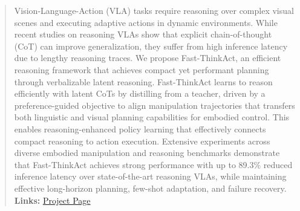 \begin{abstract}
Vision-Language-Action (VLA) tasks require reasoning over complex visual scenes and executing adaptive actions in dynamic environments. While recent studies on reasoning VLAs show that explicit chain-of-thought (CoT) can improve generalization, they suffer from high inference latency due to lengthy reasoning traces. We propose Fast-ThinkAct, an efficient reasoning framework that achieves compact yet performant planning through verbalizable latent reasoning. Fast-ThinkAct learns to reason efficiently with latent CoTs by distilling from a teacher, driven by a preference-guided objective to align manipulation trajectories that transfers both linguistic and visual planning capabilities for embodied control. This enables reasoning-enhanced policy learning that effectively connects compact reasoning to action execution. Extensive experiments across diverse embodied manipulation and reasoning benchmarks demonstrate that Fast-ThinkAct achieves strong performance with up to 89.3\% reduced inference latency over state-of-the-art reasoning VLAs, while maintaining effective long-horizon planning, few-shot adaptation, and failure recovery.\\

\textbf{Links:} \hspace{2pt}
{
\hypersetup{urlcolor=nvidiagreen}
\href{https://jasper0314-huang.github.io/fast-thinkact/}{Project Page}
}

\end{abstract}
